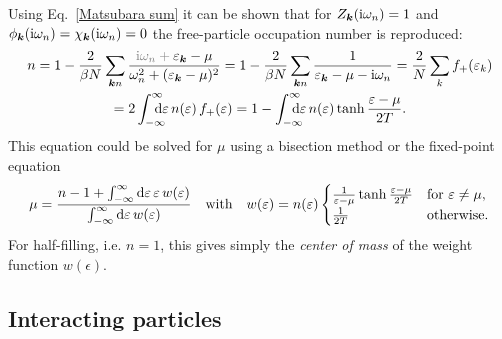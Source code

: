 Using Eq.~\ref{Matsubara sum} it can be shown that for $Z_{\boldsymbol k}(\mathrm i \omega_n)
= 1$ and $\phi_{\boldsymbol k}(\mathrm i \omega_n) = \chi_{\boldsymbol k}(\mathrm i \omega_n) = 0$ the
free-particle occupation number is reproduced:
%
\begin{multline*}
    n = 1 - \frac 2 {\beta N} \sum_{\vec k n}
    \frac
        {\textcolor{gray}{\I \omega_n + {}} \epsilon_{\vec k} - \mu}
        {\omega_n^2 + (\epsilon_{\vec k} - \mu)^2}
    = 1 - \frac 2 {\beta N} \sum_{\vec k n}
    \frac 1 {\epsilon_{\vec k} - \mu - \I \omega_n}
    = \frac 2 N \sum_k f_+(\epsilon_k)
    \\
    = 2 \int \from{-\infty} \till \infty \D \epsilon \,
    n(\epsilon) \, f_+(\epsilon)
    = 1 - \int \from{-\infty} \till \infty \D \epsilon \,
    n(\epsilon) \tanh \frac{\epsilon - \mu}{2 T}.
\end{multline*}
%
This equation could be solved for $\mu$ using a bisection method or the
fixed-point equation
%
\begin{equation*}
    \mu = \frac
        {n - 1 + \int_{-\infty}^\infty \mathrm d \varepsilon \, \varepsilon \, w(\varepsilon)}
        {\int_{-\infty}^\infty \mathrm d \varepsilon \, w(\varepsilon)}
    \quad \text{with} \quad
    w(\varepsilon) = n(\varepsilon)
    \begin{cases}
       \frac 1 {\varepsilon - \mu} \tanh \frac{\varepsilon - \mu}{2 T}
          & \text{for $\varepsilon \neq \mu$,} \\
       \frac 1 {2 T}
          & \text{otherwise.}
    \end{cases}
\end{equation*}
%
For half-filling, i.e. $n = 1$, this gives simply the \emph{center of mass} of
the weight function $w(\epsilon)$.

\subsection{Interacting particles}

